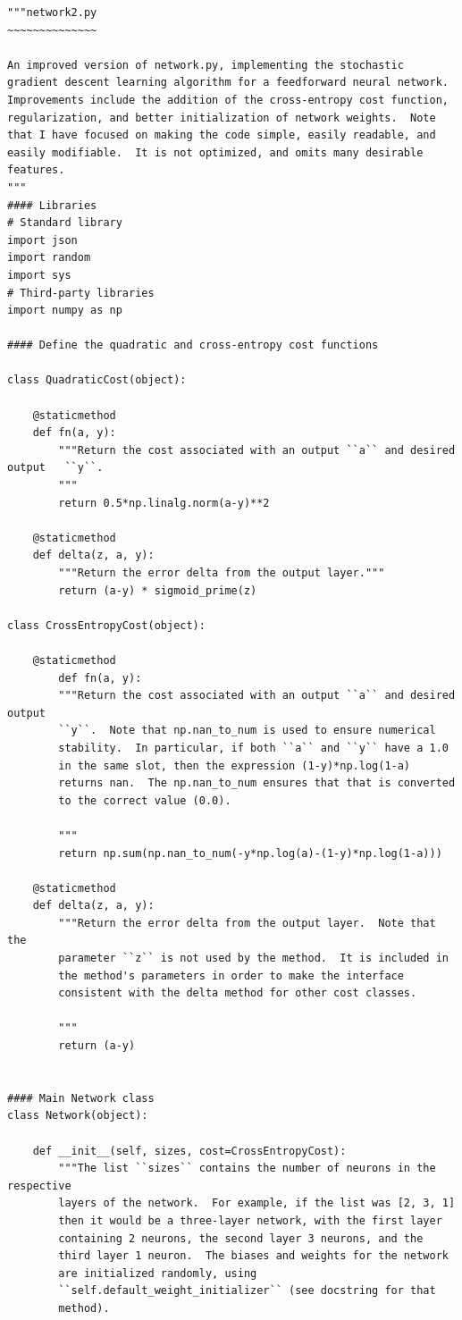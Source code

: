 \documentclass[a4paper,twoside,10pt]{book}
\begin{document}
\begin{lstlisting}
"""network2.py
~~~~~~~~~~~~~~

An improved version of network.py, implementing the stochastic
gradient descent learning algorithm for a feedforward neural network.
Improvements include the addition of the cross-entropy cost function,
regularization, and better initialization of network weights.  Note
that I have focused on making the code simple, easily readable, and
easily modifiable.  It is not optimized, and omits many desirable
features.
"""
#### Libraries
# Standard library
import json
import random
import sys
# Third-party libraries
import numpy as np

#### Define the quadratic and cross-entropy cost functions

class QuadraticCost(object):

	@staticmethod
	def fn(a, y):
		"""Return the cost associated with an output ``a`` and desired output	``y``.
		"""
		return 0.5*np.linalg.norm(a-y)**2

	@staticmethod
	def delta(z, a, y):
		"""Return the error delta from the output layer."""
		return (a-y) * sigmoid_prime(z)

class CrossEntropyCost(object):

	@staticmethod
		def fn(a, y):
		"""Return the cost associated with an output ``a`` and desired output
		``y``.  Note that np.nan_to_num is used to ensure numerical
		stability.  In particular, if both ``a`` and ``y`` have a 1.0
		in the same slot, then the expression (1-y)*np.log(1-a)
		returns nan.  The np.nan_to_num ensures that that is converted
		to the correct value (0.0).
		
		"""
		return np.sum(np.nan_to_num(-y*np.log(a)-(1-y)*np.log(1-a)))

	@staticmethod
	def delta(z, a, y):
		"""Return the error delta from the output layer.  Note that the
		parameter ``z`` is not used by the method.  It is included in
		the method's parameters in order to make the interface
		consistent with the delta method for other cost classes.
		
		"""
		return (a-y)


#### Main Network class
class Network(object):
	
	def __init__(self, sizes, cost=CrossEntropyCost):
		"""The list ``sizes`` contains the number of neurons in the respective
		layers of the network.  For example, if the list was [2, 3, 1]
		then it would be a three-layer network, with the first layer
		containing 2 neurons, the second layer 3 neurons, and the
		third layer 1 neuron.  The biases and weights for the network
		are initialized randomly, using
		``self.default_weight_initializer`` (see docstring for that
		method).
		

\end{lstlisting}
\end{document}
